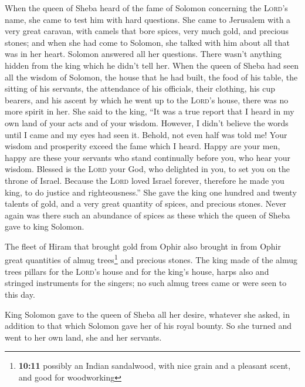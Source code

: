  When the queen of Sheba heard of the fame of Solomon
concerning the \textsc{Lord}'s name, she came to test him with hard
questions.  She came to Jerusalem with a very great
caravan, with camels that bore spices, very much gold, and precious
stones; and when she had come to Solomon, she talked with him about all
that was in her heart.  Solomon answered all her
questions. There wasn't anything hidden from the king which he didn't
tell her.  When the queen of Sheba had seen all the wisdom
of Solomon, the house that he had built,  the food of his
table, the sitting of his servants, the attendance of his officials,
their clothing, his cup bearers, and his ascent by which he went up to
the \textsc{Lord}'s house, there was no more spirit in her.
 She said to the king, ``It was a true report that I heard
in my own land of your acts and of your wisdom.  However,
I didn't believe the words until I came and my eyes had seen it. Behold,
not even half was told me! Your wisdom and prosperity exceed the fame
which I heard.  Happy are your men, happy are these your
servants who stand continually before you, who hear your wisdom.
 Blessed is the \textsc{Lord} your God, who delighted in
you, to set you on the throne of Israel. Because the \textsc{Lord} loved
Israel forever, therefore he made you king, to do justice and
righteousness.''  She gave the king one hundred and
twenty talents of gold, and a very great quantity of spices, and
precious stones. Never again was there such an abundance of spices as
these which the queen of Sheba gave to king Solomon.

 The fleet of Hiram that brought gold from Ophir also
brought in from Ophir great quantities of almug trees\footnote{\textbf{10:11}
  possibly an Indian sandalwood, with nice grain and a pleasant scent,
  and good for woodworking} and precious stones.  The
king made of the almug trees pillars for the \textsc{Lord}'s house and
for the king's house, harps also and stringed instruments for the
singers; no such almug trees came or were seen to this day.

 King Solomon gave to the queen of Sheba all her desire,
whatever she asked, in addition to that which Solomon gave her of his
royal bounty. So she turned and went to her own land, she and her
servants.

